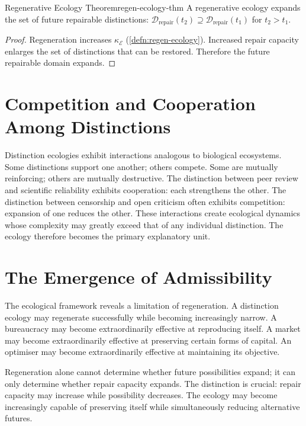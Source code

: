 \documentclass[12pt,twoside,openright]{book}
\begin{document}
\begin{theorem}{Regenerative Ecology Theorem}{regen-ecology-thm}
  A regenerative ecology expands the set of future
  repairable distinctions:
  $\mathcal{D}_\mathrm{repair}(t_2) \supseteq
  \mathcal{D}_\mathrm{repair}(t_1)$ for $t_2 > t_1$.
\end{theorem}

\begin{proof}
  Regeneration increases $\kappa_\mathcal{E}$
  (\cref{defn:regen-ecology}). Increased repair capacity
  enlarges the set of distinctions that can be restored.
  Therefore the future repairable domain expands.
\end{proof}

\section{Competition and Cooperation Among Distinctions}
\label{sec:ch12-competition}

Distinction ecologies exhibit interactions analogous to
biological ecosystems. Some distinctions support one
another; others compete. Some are mutually reinforcing;
others are mutually destructive. The distinction between
peer review and scientific reliability exhibits cooperation:
each strengthens the other. The distinction between
censorship and open criticism often exhibits competition:
expansion of one reduces the other. These interactions
create ecological dynamics whose complexity may greatly
exceed that of any individual distinction. The ecology
therefore becomes the primary explanatory unit.

\section{The Emergence of Admissibility}
\label{sec:ch12-emergence}

The ecological framework reveals a limitation of
regeneration. A distinction ecology may regenerate
successfully while becoming increasingly narrow. A
bureaucracy may become extraordinarily effective at
reproducing itself. A market may become extraordinarily
effective at preserving certain forms of capital. An
optimiser may become extraordinarily effective at
maintaining its objective.

Regeneration alone cannot determine whether future
possibilities expand; it can only determine whether repair
capacity expands. The distinction is crucial: repair
capacity may increase while possibility decreases. The
ecology may become increasingly capable of preserving
itself while simultaneously reducing alternative futures.
\end{document}
